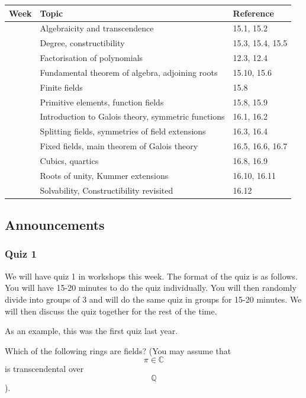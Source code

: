\documentclass[11pt]{article}
\begin{document}
\begin{center}
\begin{tabular}{lll}
Week & Topic & Reference\\
\hline
 & Algebraicity and transcendence & 15.1, 15.2\\
 & Degree, constructibility & 15.3, 15.4, 15.5\\
 & Factorisation of polynomials & 12.3, 12.4\\
 & Fundamental theorem of algebra, adjoining roots & 15.10, 15.6\\
 & Finite fields & 15.8\\
 & Primitive elements, function fields & 15.8, 15.9\\
 & Introduction to Galois theory, symmetric functions & 16.1, 16.2\\
 & Splitting fields, symmetries of field extensions & 16.3, 16.4\\
 & Fixed fields, main theorem of Galois theory & 16.5, 16.6, 16.7\\
 & Cubics, quartics & 16.8, 16.9\\
 & Roots of unity, Kummer extensions & 16.10, 16.11\\
 & Solvability, Constructibility revisited & 16.12\\
\end{tabular}
\end{center}
\subsection{Announcements}
\label{sec:org3f03a7e}
\subsubsection{Quiz 1}
\label{sec:orgf38038d}

We will have quiz 1 in workshops this week.  The format of the quiz is as follows.  You will have 15-20 minutes to do the quiz individually.  You will then randomly divide into groups of 3 and will do the same quiz in groups for 15-20 minutes.  We will then discuss the quiz together for the rest of the time.

As an example, this was the first quiz last year.

Which of the following rings are fields? (You may assume that $$\pi \in \mathbb{C}$$ is transcendental over $$\mathbb{Q}$$).
\end{document}
